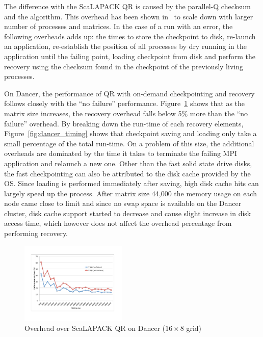 The difference with the ScaLAPACK QR is caused by the parallel-Q
checksum and the \abft algorithm. This overhead has been shown
in~\cite{lawn253} to scale down with larger number of processes and
matrices. In the case of a run with an error, the following overheads
adds up: the times to store the checkpoint to disk, re-launch an
application, re-establish the position of all processes by dry running
in the application until the failing point, loading checkpoint from
disk and perform the \abft recovery using the checksum found in the
checkpoint of the previously living processes. 

On Dancer, the performance of QR with on-demand checkpointing and
recovery follows closely with the ``no failure''
performance. Figure~\ref{fig:dancer_percentage} shows that as the
matrix size increases, the recovery overhead falls below 5\% more than
the ``no failure'' overhead. By breaking down the run-time of each
recovery elements, Figure~\ref{fig:dancer_timing} shows that
checkpoint saving and loading only take a small percentage of the
total run-time.  On a problem of this size, the additional overheads
are dominated by the time it takes to terminate the failing MPI
application and relaunch a new one. Other than the fast solid state
drive disks, the fast checkpointing can also be attributed to the disk cache
provided by the OS. Since loading is performed
immediately after saving, high disk cache hits can
largely speed up the process. After matrix size 44,000 the memory
usage on each node came close to limit and since no swap space is 
available on the Dancer cluster, disk cache support started
to decrease and cause slight increase in disk access time, which however does not
affect the overhead percentage from performing recovery. 

\begin{figure}[tb]
	\centering
	\includegraphics[totalheight=0.25\textheight, width=0.45\textwidth,viewport=70 90 720 530, clip]{figures/dancer_percentage}
	\caption{Overhead over ScaLAPACK QR on Dancer ($16\times 8$ grid)}
	\label{fig:dancer_percentage}
\end{figure}

